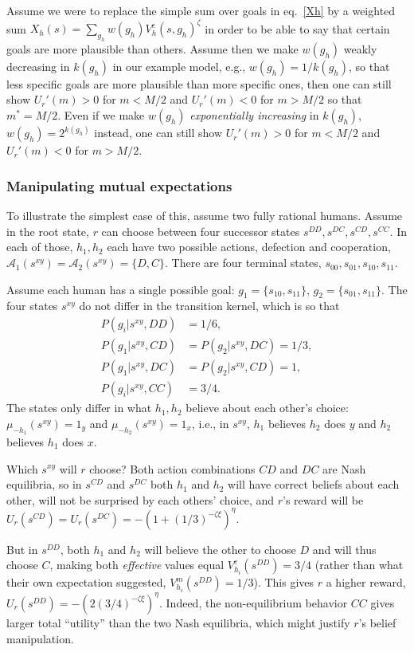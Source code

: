 \documentclass[letterpaper]{article} %
\def\A{\mathcal{A}}
\begin{document}
Assume we were to replace the simple sum over goals in eq.~\eqref{Xh} by a weighted sum $X_h(s)=\sum_{g_h}w(g_h)V^e_h(s,g_h)^\zeta$ in order to be able to say that certain goals are more plausible than others.
Assume then we make $w(g_h)$ weakly decreasing in $k(g_h)$ in our example model, e.g., $w(g_h)=1/k(g_h)$, so that less specific goals are more plausible than more specific ones, then one can still show $U_r'(m)>0$ for $m<M/2$ and $U_r'(m)<0$ for $m>M/2$ so that $m^\ast=M/2$.
Even if we make $w(g_h)$ {\em exponentially increasing} in $k(g_h)$, $w(g_h)=2^{k(g_h)}$ instead, one can still show $U_r'(m)>0$ for $m<M/2$ and $U_r'(m)<0$ for $m>M/2$. 

\subsubsection*{Manipulating mutual expectations}

To illustrate the simplest case of this, assume two fully rational humans. 
Assume in the root state, $r$ can choose between four successor states $s^{DD},s^{DC},s^{CD},s^{CC}$.
In each of those, $h_1,h_2$ each have two possible actions, defection and cooperation, $\A_1(s^{xy})=\A_2(s^{xy})=\{D,C\}$.
There are four terminal states, $s_{00},s_{01},s_{10},s_{11}$.

Assume each human has a single possible goal: $g_1=\{s_{10},s_{11}\}$, $g_2=\{s_{01},s_{11}\}$.
The four states $s^{xy}$ do not differ in the transition kernel, which is so that 
\begin{align*}
P(g_i|s^{xy},DD)&=1/6, \\
P(g_1|s^{xy},CD)&=P(g_2|s^{xy},DC)=1/3, \\
P(g_1|s^{xy},DC)&=P(g_2|s^{xy},CD)=1, \\ 
P(g_i|s^{xy},CC)&=3/4.
\end{align*}
The states only differ in what $h_1,h_2$ believe about each other's choice:
$\mu_{-h_1}(s^{xy})=1_y$ and $\mu_{-h_2}(s^{xy})=1_x$, i.e., in $s^{xy}$, $h_1$ believes $h_2$ does $y$ and $h_2$ believes $h_1$ does $x$.

Which $s^{xy}$ will $r$ choose? 
Both action combinations $CD$ and $DC$ are Nash equilibria, so in $s^{CD}$ and $s^{DC}$ both $h_1$ and $h_2$ will have correct beliefs about each other, will not be surprised by each others' choice, and $r$'s reward will be $U_r(s^{CD})=U_r(s^{DC})=-(1+(1/3)^{-\zeta\xi})^\eta$.

But in $s^{DD}$, both $h_1$ and $h_2$ will believe the other to choose $D$ and will thus choose $C$, making both {\em effective} values equal $V^e_{h_i}(s^{DD})=3/4$ (rather than what their own expectation suggested, $V^m_{h_i}(s^{DD})=1/3$).
This gives $r$ a higher reward, $U_r(s^{DD})=-(2(3/4)^{-\zeta\xi})^\eta$.
Indeed, the non-equilibrium behavior $CC$ gives larger total ``utility'' than the two Nash equilibria,
which might justify $r$'s belief manipulation.
\end{document}
